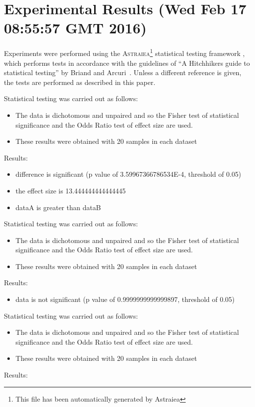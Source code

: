 \documentclass[]{article}
\begin{document}
\section{Experimental Results (Wed Feb 17 08:55:57 GMT 2016)}
Experiments were performed using the \textsc{Astraiea}\footnote{This file has been automatically generated by Astraiea} statistical testing framework \cite{Neumann:2014:EET:2598394.2609850},
which performs tests in accordance with the guidelines of ``A Hitchhikers guide to statistical testing''
by Briand and Arcuri~\cite{Arcuri2012}.
Unless a different reference is given, the tests are performed as described in this paper.

Statistical testing was carried out as follows: \begin{itemize}
\item{The data is dichotomous and unpaired and so the Fisher test of statistical significance and the Odds Ratio test of effect size are used.}
\item{These results were obtained with 20 samples in each dataset}
\end{itemize}Results:
\begin{itemize}
\item{difference is significant (p value of 3.59967366786534E-4, threshold of 0.05)}
\item{the effect size is 13.444444444444445}
\item{dataA is greater than dataB}
\end{itemize}Statistical testing was carried out as follows: \begin{itemize}
\item{The data is dichotomous and unpaired and so the Fisher test of statistical significance and the Odds Ratio test of effect size are used.}
\item{These results were obtained with 20 samples in each dataset}
\end{itemize}Results:
\begin{itemize}
\item{data is not significant (p value of 0.9999999999999897, threshold of 0.05)}
\end{itemize}Statistical testing was carried out as follows: \begin{itemize}
\item{The data is dichotomous and unpaired and so the Fisher test of statistical significance and the Odds Ratio test of effect size are used.}
\item{These results were obtained with 20 samples in each dataset}
\end{itemize}Results:
\end{document}

